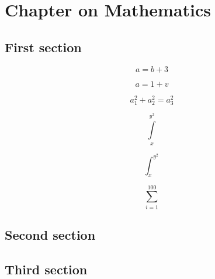 \chapter{Chapter on Mathematics}
\blindtext[1]

\section{First section}
\[ a= b+3\]

\begin{equation}
a=1+v
\end{equation}

\[ a_1^2 + a_2^2 = a_3^2 \]

\[  \int\limits_x^{y^2}  \]

\[  \int_x^{y^2}  \]

\[ \sum_{i=1}^{100}  \]

\section{Second section}
\blindtext[1]

\section{Third section}
\blindtext[1]

\blindtext[1]

\blindtext[1]